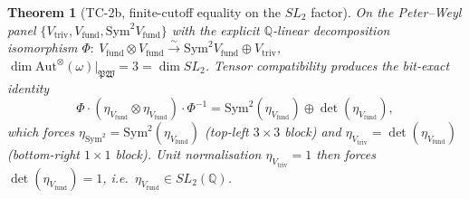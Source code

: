 \documentclass[11pt,a4paper]{article}
\theoremstyle{plain}
\newtheorem{theorem}{Theorem}[section]
\theoremstyle{definition}
\newcommand{\Aut}{\mathrm{Aut}}
\newcommand{\Q}{\mathbb{Q}}
\newcommand{\fibfun}{\omega}
\begin{document}
\begin{theorem}[TC-2b, finite-cutoff equality on the $SL_{2}$ factor]\label{thm:tc2b_sl2_equality}
On the Peter--Weyl panel $\{V_{\mathrm{triv}}, V_{\mathrm{fund}},
\mathrm{Sym}^{2} V_{\mathrm{fund}}\}$ with the explicit $\Q$-linear
decomposition isomorphism $\Phi:\ V_{\mathrm{fund}} \otimes V_{\mathrm{fund}}
\xrightarrow{\sim} \mathrm{Sym}^{2} V_{\mathrm{fund}} \oplus V_{\mathrm{triv}}$,
$\dim \Aut^{\otimes}(\fibfun)\big|_{\mathfrak{PW}} = 3 = \dim SL_{2}$.
Tensor compatibility produces the bit-exact identity
\[
\Phi \cdot (\eta_{V_{\mathrm{fund}}} \otimes \eta_{V_{\mathrm{fund}}}) \cdot \Phi^{-1}
   = \mathrm{Sym}^{2}(\eta_{V_{\mathrm{fund}}}) \oplus \det(\eta_{V_{\mathrm{fund}}}),
\]
which forces $\eta_{\mathrm{Sym}^{2}} = \mathrm{Sym}^{2}(\eta_{V_{\mathrm{fund}}})$
(top-left $3 \times 3$ block) and $\eta_{V_{\mathrm{triv}}} = \det(\eta_{V_{\mathrm{fund}}})$
(bottom-right $1 \times 1$ block). Unit normalisation
$\eta_{V_{\mathrm{triv}}} = 1$ then forces
$\det(\eta_{V_{\mathrm{fund}}}) = 1$, i.e.\ $\eta_{V_{\mathrm{fund}}} \in SL_{2}(\Q)$.
\end{theorem}
\end{document}
